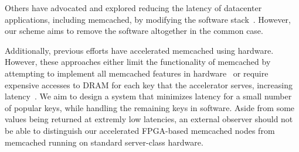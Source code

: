 Others have advocated and explored reducing the latency of datacenter
applications, including memcached, by modifying the software
stack~\cite{rumbleHotos, memcachefacebook}. However, our scheme aims to remove
the software altogether in the common case. 

Additionally, previous efforts have accelerated memcached using hardware.
However, these approaches either limit the functionality of memcached by
attempting to implement all memcached features in
hardware~\cite{memcachedappliance} or require expensive accesses to DRAM for
each key that the accelerator serves, increasing
latency~\cite{memcachedDRAMaccel}.  We aim to design a system that minimizes
latency for a small number of popular keys, while handling the remaining keys
in software. Aside from some values being returned at extremly low latencies,
an external observer should not be able to distinguish our accelerated
FPGA-based memcached nodes from memcached running on standard server-class
hardware.
